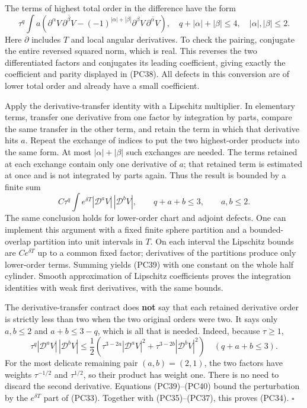 \documentclass[
  11pt,
]{article}
\begin{document}
The terms of highest total order in the difference have the form \[
\tau^q\int a\left(
 \partial^\alpha V\,\overline{\partial^\beta V}
 -(-1)^{|\alpha|+|\beta|}
 \partial^\beta V\,\overline{\partial^\alpha V}\right),
\quad q+|\alpha|+|\beta|\leq4,\quad |\alpha|,|\beta|\leq2.
\tag{PC38}
\] Here \(\partial\) includes \(T\) and local angular derivatives. To
check the pairing, conjugate the entire reversed squared norm, which is
real. This reverses the two differentiated factors and conjugates its
leading coefficient, giving exactly the coefficient and parity displayed
in (PC38). All defects in this conversion are of lower total order and
already have a small coefficient.

Apply the derivative-transfer identity with a Lipschitz multiplier. In
elementary terms, transfer one derivative from one factor by integration
by parts, compare the same transfer in the other term, and retain the
term in which that derivative hits \(a\). Repeat the exchange of indices
to put the two highest-order products into the same form. At most
\(|\alpha|+|\beta|\) such exchanges are needed. The terms retained at
each exchange contain only one derivative of \(a\); that retained term
is estimated at once and is not integrated by parts again. Thus the
result is bounded by a finite sum \[
C\tau^q\int e^{\delta T}
                 |\mathscr D^aV|\,|\mathscr D^bV|,
\qquad q+a+b\leq3,\qquad a,b\leq2.
\tag{PC39}
\] The same conclusion holds for lower-order chart and adjoint defects.
One can implement this argument with a fixed finite sphere partition and
a bounded-overlap partition into unit intervals in \(T\). On each
interval the Lipschitz bounds are \(Ce^{\delta T}\) up to a common fixed
factor; derivatives of the partitions produce only lower-order terms.
Summing yields (PC39) with one constant on the whole half cylinder.
Smooth approximation of Lipschitz coefficients proves the integration
identities with weak first derivatives, with the same bounds.

The derivative-transfer contract does \textbf{not} say that each
retained derivative order is strictly less than two when the two
original orders were two. It says only \(a,b\leq2\) and \(a+b\leq3-q\),
which is all that is needed. Indeed, because \(\tau\geq1\), \[
\tau^q|\mathscr D^aV|\,|\mathscr D^bV|
\leq\frac12\left(
 \tau^{3-2a}|\mathscr D^aV|^2
 +\tau^{3-2b}|\mathscr D^bV|^2\right)
\quad(q+a+b\leq3).
\tag{PC40}
\] For the most delicate remaining pair \((a,b)=(2,1)\), the two factors
have weights \(\tau^{-1/2}\) and \(\tau^{1/2}\), so their product has
weight one. There is no need to discard the second derivative. Equations
(PC39)--(PC40) bound the perturbation by the \(e^{\delta T}\) part of
(PC33). Together with (PC35)--(PC37), this proves (PC34). \(\square\)
\end{document}
